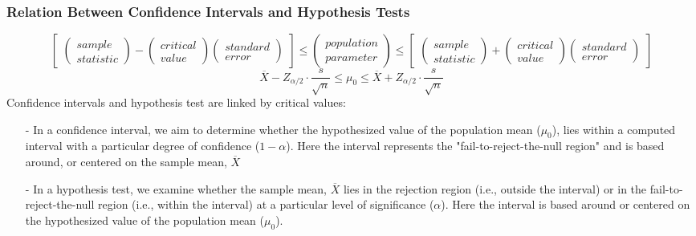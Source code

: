 \subsubsection{Relation Between Confidence Intervals and Hypothesis Tests} %
\label{ssub:Relation Between Confidence Intervals and Hypothesis Tests}
\[
	\begin{bmatrix}
		\begin{pmatrix}
			sample \\
			statistic
		\end{pmatrix} -
		\begin{pmatrix}
			critical \\
			value
		\end{pmatrix}
		\begin{pmatrix}
			standard \\
			error
		\end{pmatrix}
	\end{bmatrix}
	\leq
	\begin{pmatrix}
		population \\
		parameter
	\end{pmatrix}
	\leq
	\begin{bmatrix}
		\begin{pmatrix}
			sample \\
			statistic
		\end{pmatrix} +
		\begin{pmatrix}
			critical \\
			value
		\end{pmatrix}
		\begin{pmatrix}
			standard \\
			error
		\end{pmatrix}
	\end{bmatrix}\]
\newline
$$
	\overline{X} - Z_{\alpha/2} \cdot \frac{s}{\sqrt{n}} \leq \mu_0 \leq \overline{X} + Z_{\alpha/2} \cdot \frac{s}{\sqrt{n}}
$$
Confidence intervals and hypothesis test are linked by critical values:
\begin{itemize}
	\item[-] In a confidence interval, we aim to determine whether the hypothesized value of the population mean ($\mu_0$),
	      lies within a computed interval with a particular degree of confidence ($1-\alpha$).
	      Here the interval represents the "fail-to-reject-the-null region" and is based around, or centered on the sample mean, $\overline{X}$
	\item[-] In a hypothesis test, we examine whether the sample mean, $\overline{X}$
	      lies in the rejection region (i.e., outside the interval) or in the fail-to-reject-the-null region (i.e., within the interval) at a particular level of significance ($\alpha$).
	      Here the interval is based around or centered on the hypothesized value of the population mean ($\mu_0$).
\end{itemize}

